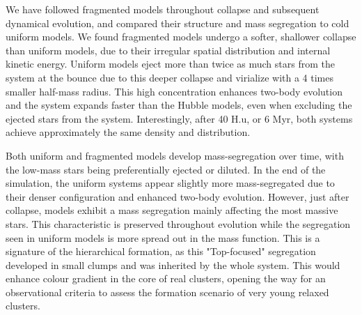 We have followed \HubLem fragmented models throughout collapse and subsequent dynamical evolution, and compared their structure and mass segregation to cold uniform models. We found fragmented models undergo a softer, shallower collapse than uniform models, due to their irregular spatial distribution and internal kinetic energy. Uniform models eject more than twice as much stars from the system at the bounce due to this deeper collapse and virialize with a 4 times smaller half-mass radius. This high concentration enhances two-body evolution and the system expands faster than the Hubble models, even when excluding the ejected stars from the system. Interestingly, after 40 H.u, or 6 Myr, both systems achieve approximately the same density and distribution.

Both uniform and fragmented models develop mass-segregation over time, with the low-mass stars being preferentially ejected or diluted. In the end of the simulation, the uniform systems appear slightly more mass-segregated due to their denser configuration and enhanced two-body evolution. However, just after collapse, \HubLem models exhibit a mass segregation mainly affecting the most massive stars. This characteristic is preserved throughout evolution while the segregation seen in uniform models is more spread out in the mass function. This is  a signature of the hierarchical formation, as this "Top-focused" segregation developed in small clumps and was inherited by the whole system. This would enhance colour gradient in the core of real clusters, opening the way for an observational criteria to assess the formation scenario of very young relaxed clusters.






